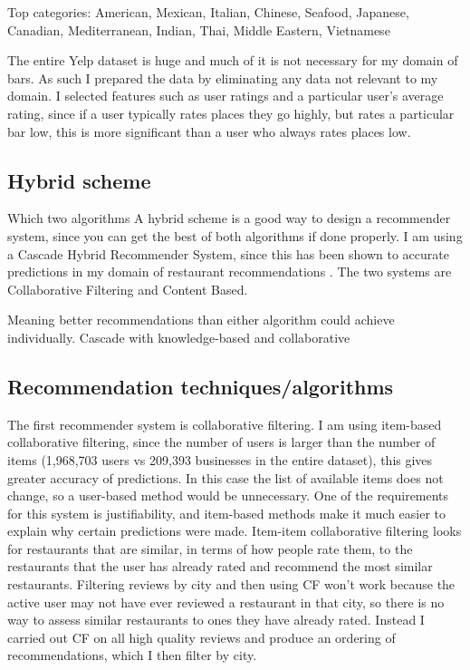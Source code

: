 \documentclass[conference]{IEEEtran}
\begin{document}
Top categories: American, Mexican, Italian, Chinese, Seafood, Japanese, Canadian, Mediterranean, Indian, Thai, Middle Eastern, Vietnamese

The entire Yelp dataset is huge and much of it is not necessary for my domain of bars.
As such I prepared the data by eliminating any data not relevant to my domain.
I selected features such as user ratings and a particular user's average rating,
since if a user typically rates places they go highly, but rates a particular bar low,
this is more significant than a user who always rates places low.

\subsection{Hybrid scheme}
Which two algorithms
A hybrid scheme is a good way to design a recommender system, since you can get the
best of both algorithms if done properly. 
I am using a Cascade Hybrid Recommender System, since this has been shown to accurate predictions 
in my domain of restaurant recommendations \cite{burke2007hybrid}. 
The two systems are Collaborative Filtering and Content Based. 

Meaning better recommendations than either algorithm could achieve individually.
Cascade with knowledge-based and collaborative


\subsection{Recommendation techniques/algorithms}
The first recommender system is collaborative filtering.
I am using item-based collaborative filtering, since the number of users is larger than the number of items 
(1,968,703 users vs 209,393 businesses in the entire dataset), this gives greater accuracy of predictions. 
In this case the list of available items does not change, so a user-based method would be unnecessary. 
One of the requirements for this system is justifiability, and item-based methods make it much easier to 
explain why certain predictions were made. 
Item-item collaborative filtering looks for restaurants that are similar, in terms of how people rate them, 
to the restaurants that the user has already rated and recommend the most similar restaurants. 
Filtering reviews by city and then using CF won't work because the active user may not have ever reviewed a restaurant 
in that city, so there is no way to assess similar restaurants to ones they have already rated. 
Instead I carried out CF on all high quality reviews and produce an ordering of recommendations, which I then filter 
by city. 
\end{document}
